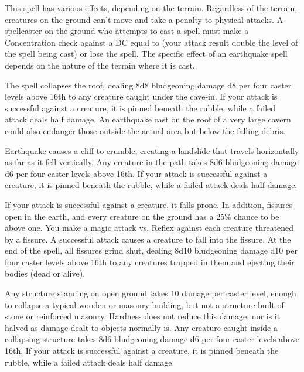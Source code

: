 \begin{spelleffect}
    This spell has various effects, depending on the terrain. Regardless of the terrain, creatures on the ground can't move and take a  penalty to physical attacks. A spellcaster on the ground who attempts to cast a spell must make a Concentration check against a DC equal to (your attack result \add double the level of the spell being cast) or lose the spell. The specific effect of an earthquake spell depends on the nature of the terrain where it is cast.
    \par {} The spell collapses the roof, dealing 8d8 bludgeoning damage \add d8 per four caster levels above 16th to any creature caught under the cave-in. If your attack is successful against a creature, it is pinned beneath the rubble, while a failed attack deals half damage. An earthquake cast on the roof of a very large cavern could also endanger those outside the actual area but below the falling debris.
    \par {} Earthquake causes a cliff to crumble, creating a landslide that travels horizontally as far as it fell vertically. Any creature in the path takes 8d6 bludgeoning damage \add d6 per four caster levels above 16th. If your attack is successful against a creature, it is pinned beneath the rubble, while a failed attack deals half damage.
    \par {} If your attack is successful against a creature, it falls prone. In addition, fissures open in the earth, and every creature on the ground has a 25\% chance to be above one. You make a magic attack vs. Reflex against each creature threatened by a fissure. A successful attack causes a creature to fall into the fissure. At the end of the spell, all fissures grind shut, dealing 8d10 bludgeoning damage \add d10 per four caster levels above 16th to any creatures trapped in them and ejecting their bodies (dead or alive).
    \par {} Any structure standing on open ground takes 10 damage per caster level, enough to collapse a typical wooden or masonry building, but not a structure built of stone or reinforced masonry. Hardness does not reduce this damage, nor is it halved as damage dealt to objects normally is. Any creature caught inside a collapsing structure takes 8d6 bludgeoning damage \add d6 per four caster levels above 16th. If your attack is successful against a creature, it is pinned beneath the rubble, while a failed attack deals half damage.

\end{spelleffect}
